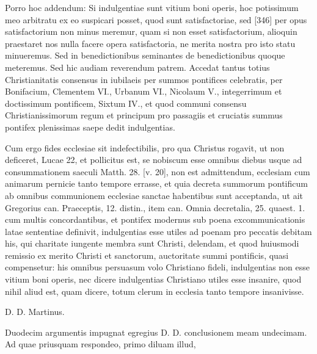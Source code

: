 Porro hoc addendum: Si indulgentiae sunt vitium boni operis, hoc potissimum meo arbitratu ex eo suspicari posset, quod sunt satisfactoriae, sed [346] per opus satisfactorium non minus meremur, quam si non esset satisfactorium, alioquin praestaret nos nulla facere opera satisfactoria, ne merita nostra pro isto statu minueremus. Sed in benedictionibus seminantes de benedictionibus quoque meteremus. Sed hic audiam reverendum patrem. Accedat tantus totius Christianitatis consensus in iubilaeis per summos pontifices celebratis, per Bonifacium, Clementem VI., Urbanum VI., Nicolaum V., integerrimum et doctissimum pontificem, Sixtum IV., et quod communi consensu Christianissimorum regum et principum pro passagiis et cruciatis summus pontifex plenissimas saepe dedit indulgentias.

Cum ergo fides ecclesiae sit indefectibilis, pro qua Christus rogavit, ut non deficeret, Lucae 22, et pollicitus est, se nobiscum esse omnibus diebus usque ad consummationem saeculi Matth. 28. [v. 20], non est admittendum, ecclesiam cum animarum pernicie tanto tempore errasse, et quia decreta summorum pontificum ab omnibus communionem ecclesiae sanctae habentibus sunt acceptanda, ut ait Gregorius can. Praeceptis, 12. distin., item can. Omnia decretalia, 25. quaest. 1. cum multis concordantibus, et pontifex modernus sub poena excommunicationis latae sententiae definivit, indulgentias esse utiles ad poenam pro peccatis debitam his, qui charitate iungente membra sunt Christi, delendam, et quod huiusmodi remissio ex merito Christi et sanctorum, auctoritate summi pontificis, quasi compensetur: his omnibus persuasum volo Christiano fideli, indulgentias non esse vitium boni operis, nec dicere indulgentias Christiano utiles esse insanire, quod nihil aliud est, quam dicere, totum clerum in ecclesia tanto tempore insanivisse.

D. D. Martinus.

Duodecim argumentis impugnat egregius D. D. conclusionem meam undecimam. Ad quae priusquam respondeo, primo diluam illud,

